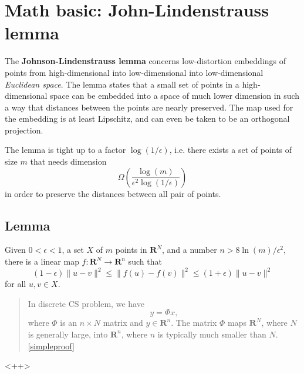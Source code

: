 \chapter{Math basic: John-Lindenstrauss lemma}
The \textbf{\textcolor[rgb]{1,0,0}{Johnson-Lindenstrauss lemma}} concerns low-distortion embeddings of points from high-dimensional into low-dimensional into low-dimensional \emph{Euclidean space}. The lemma states that a small set of points in a high-dimensional space can be embedded into a space of much lower dimension in such a way that distances between the points are nearly preserved. The map used for the embedding is at least Lipschitz, and can even be taken to be an orthogonal projection.

The lemma is tight up to a factor $\log (1/\epsilon)$, i.e. there exists a set of points of size $m$ that needs dimension 
\begin{equation*}
    \Omega \left(\dfrac{\log (m)}{\epsilon^2 \log (1/\epsilon)}\right)
\end{equation*}
in order to \textcolor[rgb]{1,0,0}{preserve the distances between all pair of points}.

\section{Lemma}
\begin{definition}
    Given $0<\epsilon<1$, a set $X$ of $m$ points in $\mathbf{R}^N$, and a number $n>8\ln(m)/\epsilon^2$, there is a linear map $f:\mathbf{R}^N \rightarrow \mathbf{R}^n$ such that
    \begin{equation*}
        (1-\epsilon)\|u-v\|^2 \leq \|f(u)-f(v)\|^2 \leq (1+\epsilon)\|u-v\|^2
    \end{equation*}
    for all $u,v \in X$.
\end{definition}

\begin{quote}
    In discrete CS problem, we have
    \begin{equation*}
        y = \Phi x,
    \end{equation*}
    where $\Phi$ is an $n \times N$ matrix and $y \in \mathbf{R}^n$. The matrix $\Phi$ maps $\mathbf{R}^N$, where $N$ is generally large, into $\mathbf{R}^n$, where $n$ is typically much smaller than $N$.\cref{simpleproof}
\end{quote}<++>
